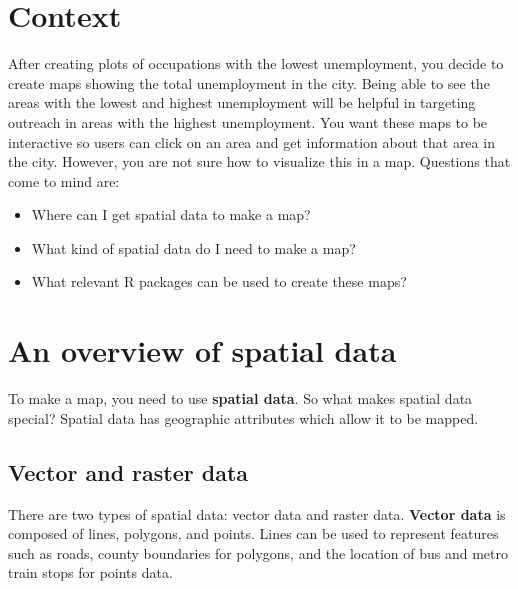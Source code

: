 \documentclass[
  krantz2]{krantz}
\providecommand{\tightlist}{%
  \setlength{\itemsep}{0pt}\setlength{\parskip}{0pt}}
\begin{document}
\hypertarget{tmap-context}{%
\section{Context}\label{tmap-context}}

After creating plots of occupations with the lowest unemployment, you decide to create maps showing the total unemployment in the city. Being able to see the areas with the lowest and highest unemployment will be helpful in targeting outreach in areas with the highest unemployment. You want these maps to be interactive so users can click on an area and get information about that area in the city. However, you are not sure how to visualize this in a map. Questions that come to mind are:

\begin{itemize}
\tightlist
\item
  Where can I get spatial data to make a map?
\item
  What kind of spatial data do I need to make a map?
\item
  What relevant R packages can be used to create these maps?
\end{itemize}

\hypertarget{spatial-overview}{%
\section{An overview of spatial data}\label{spatial-overview}}

To make a map, you need to use \textbf{spatial data}. So what makes spatial data special? Spatial data has geographic attributes which allow it to be mapped.

\hypertarget{vector-and-raster-data}{%
\subsection{Vector and raster data}\label{vector-and-raster-data}}

There are two types of spatial data: vector data and raster data. \textbf{Vector data} is composed of lines, polygons, and points. Lines can be used to represent features such as roads, county boundaries for polygons, and the location of bus and metro train stops for points data.
\end{document}
